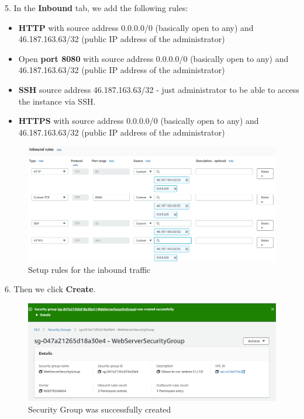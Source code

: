 \documentclass[12pt,a4paper,twoside]{article}
\begin{document}
5. In the \textbf{Inbound} tab, we add the following rules:
\begin{itemize}
	\item \textbf{HTTP} with source address 0.0.0.0/0 (basically open to any) and 46.187.163.63/32 (public IP address of the administrator)
	\item Open \textbf{port 8080} with source address 0.0.0.0/0 (basically open to any) and 46.187.163.63/32 (public IP address of the administrator)
	\item \textbf{SSH}   source address 46.187.163.63/32 - just administrator to be able to access the instance via SSH.
	\item \textbf{HTTPS} with source address 0.0.0.0/0 (basically open to any) and 46.187.163.63/32 (public IP address of the administrator)
\end{itemize}


\begin{figure}[H]
    \centering
        \includegraphics[width=15cm]{images-aws/2-inbound-rules.png}
        \caption{Setup rules for the inbound traffic}
\end{figure}


6. Then we click \textbf{Create}.


\begin{figure}[H]
    \centering
        \includegraphics[width=15cm]{images-aws/3-create-sg-created.png}
        \caption{Security Group was successfully created}
\end{figure}
\end{document}
